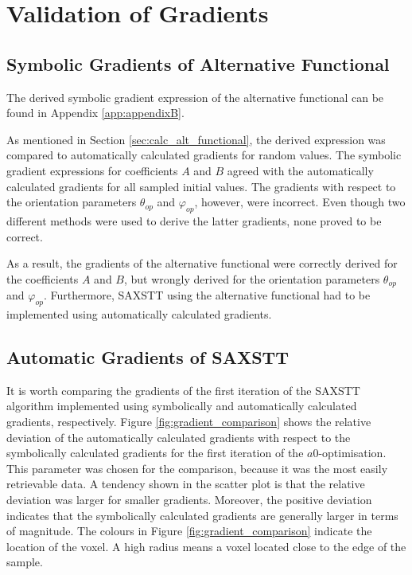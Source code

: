 \chapter{Validation of Gradients}


\section{Symbolic Gradients of Alternative Functional}

The derived symbolic gradient expression of the alternative functional can be found in Appendix \ref{app:appendixB}.

As mentioned in Section \ref{sec:calc_alt_functional}, the derived expression was compared to automatically calculated gradients for random values.
The symbolic gradient expressions for coefficients $A$ and $B$ agreed with the automatically calculated gradients for all sampled initial values.
The gradients with respect to the orientation parameters $\theta_{op}$ and $\varphi_{op}$, however, were incorrect.
Even though two different methods were used to derive the latter gradients, none proved to be correct.

As a result, the gradients of the alternative functional were correctly derived for the coefficients $A$ and $B$,
but wrongly derived for the orientation parameters $\theta_{op}$ and $\varphi_{op}$.
Furthermore, SAXSTT using the alternative functional had to be implemented using automatically calculated gradients.

\section{Automatic Gradients of SAXSTT}

It is worth comparing the gradients of the first iteration of the SAXSTT algorithm implemented using symbolically and automatically calculated gradients, respectively.
Figure \ref{fig:gradient_comparison} shows
the relative deviation of the automatically calculated gradients with respect to the symbolically calculated gradients for the first iteration of the $a0$-optimisation.
This parameter was chosen for the comparison, because it was the most easily retrievable data.
A tendency shown in the scatter plot is that the relative deviation was larger for smaller gradients.
Moreover, the positive deviation indicates that the symbolically calculated gradients are generally larger in terms of magnitude.
The colours in Figure \ref{fig:gradient_comparison} indicate the location of the voxel. A high radius means a voxel located close to the edge of the sample.

